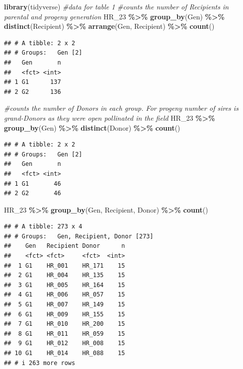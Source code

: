 \documentclass[
]{article}
\newenvironment{Shaded}{\begin{snugshade}}{\end{snugshade}}
\newcommand{\CommentTok}[1]{\textcolor[rgb]{0.56,0.35,0.01}{\textit{#1}}}
\newcommand{\FunctionTok}[1]{\textcolor[rgb]{0.13,0.29,0.53}{\textbf{#1}}}
\newcommand{\NormalTok}[1]{#1}
\newcommand{\SpecialCharTok}[1]{\textcolor[rgb]{0.81,0.36,0.00}{\textbf{#1}}}
\begin{document}
\begin{Shaded}
\begin{Highlighting}[]
\FunctionTok{library}\NormalTok{(tidyverse)}
\CommentTok{\#data for table 1}
\CommentTok{\#counts the number of Recipients in parental and progeny generation}
\NormalTok{HR\_23 }\SpecialCharTok{\%\textgreater{}\%}
  \FunctionTok{group\_by}\NormalTok{(Gen) }\SpecialCharTok{\%\textgreater{}\%} 
  \FunctionTok{distinct}\NormalTok{(Recipient) }\SpecialCharTok{\%\textgreater{}\%}
  \FunctionTok{arrange}\NormalTok{(Gen, Recipient) }\SpecialCharTok{\%\textgreater{}\%}
  \FunctionTok{count}\NormalTok{()}
\end{Highlighting}
\end{Shaded}

\begin{verbatim}
## # A tibble: 2 x 2
## # Groups:   Gen [2]
##   Gen       n
##   <fct> <int>
## 1 G1      137
## 2 G2      136
\end{verbatim}

\begin{Shaded}
\begin{Highlighting}[]
\CommentTok{\#counts the number of Donors in each group. For progeny number of sires is grand{-}Donors as they were open pollinated in the field }
\NormalTok{HR\_23 }\SpecialCharTok{\%\textgreater{}\%}
  \FunctionTok{group\_by}\NormalTok{(Gen) }\SpecialCharTok{\%\textgreater{}\%} 
  \FunctionTok{distinct}\NormalTok{(Donor) }\SpecialCharTok{\%\textgreater{}\%}
  \FunctionTok{count}\NormalTok{()}
\end{Highlighting}
\end{Shaded}

\begin{verbatim}
## # A tibble: 2 x 2
## # Groups:   Gen [2]
##   Gen       n
##   <fct> <int>
## 1 G1       46
## 2 G2       46
\end{verbatim}

\begin{Shaded}
\begin{Highlighting}[]
\NormalTok{HR\_23 }\SpecialCharTok{\%\textgreater{}\%}
  \FunctionTok{group\_by}\NormalTok{(Gen, Recipient, Donor) }\SpecialCharTok{\%\textgreater{}\%} 
  \FunctionTok{count}\NormalTok{()}
\end{Highlighting}
\end{Shaded}

\begin{verbatim}
## # A tibble: 273 x 4
## # Groups:   Gen, Recipient, Donor [273]
##    Gen   Recipient Donor      n
##    <fct> <fct>     <fct>  <int>
##  1 G1    HR_001    HR_171    15
##  2 G1    HR_004    HR_135    15
##  3 G1    HR_005    HR_164    15
##  4 G1    HR_006    HR_057    15
##  5 G1    HR_007    HR_149    15
##  6 G1    HR_009    HR_155    15
##  7 G1    HR_010    HR_200    15
##  8 G1    HR_011    HR_059    15
##  9 G1    HR_012    HR_008    15
## 10 G1    HR_014    HR_088    15
## # i 263 more rows
\end{verbatim}
\end{document}
